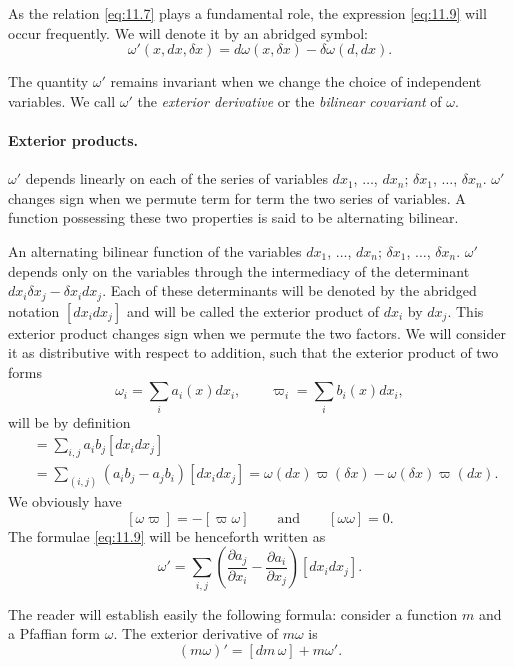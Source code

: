 \documentclass[leqno,11pt]{book}
\numberwithin{equation}{chapter}
\newcommand{\pd}{\partial}
\theoremstyle{shape1}
\theoremstyle{shapesmall}
\newcommand{\vp}{\varpi}
\begin{document}
As the relation \eqref{eq:11.7} plays a fundamental role, the expression \eqref{eq:11.9} will occur frequently. We will denote it by an abridged symbol:
\begin{equation}
  \label{eq:11.10}
  \omega'(x,dx,\delta x)=d\omega(x,\delta x)-\delta\omega(d,dx).
\end{equation}

The quantity $\omega'$ remains invariant when we change the choice of independent variables. We call $\omega'$ the \emph{exterior derivative} or the \emph{bilinear covariant} of $\omega$.

\paragraph{Exterior products.}
\label{sec:156}
$\omega'$ depends linearly on each of the series of variables $dx_{1}$, $\dots$, $dx_{n}$; $\delta x_{1}$, $\dots$, $\delta x_{n}$. $\omega'$ changes sign when we permute term for term the two series of variables. A function possessing these two properties is said to be alternating bilinear.

An alternating bilinear function of the variables $dx_{1}$, $\dots$, $dx_{n}$; $\delta x_{1}$, $\dots$, $\delta x_{n}$. $\omega'$ depends only on the variables through the intermediacy of the determinant $dx_{i}\delta x_{j}-\delta x_{i}dx_{j}$. Each of these determinants will be denoted by the abridged notation $[dx_{i}dx_{j}]$ and will be called the exterior product of $dx_{i}$ by $dx_{j}$. This exterior product changes sign when we permute the two factors. We will consider it as distributive with respect to addition, such that the exterior product of two forms
\[
\omega_{i}=\sum_{i}a_{i}(x)dx_{i},\qquad\vp_{i}=\sum_{i}b_{i}(x)dx_{i},
\]
will be by definition
\begin{align*}
  [\omega\vp]&=\sum_{i,j}a_{i}b_{j}[dx_{i}dx_{j}]\\
  &=\sum_{(i,j)}(a_{i}b_{j}-a_{j}b_{i})[dx_{i}dx_{j}]=\omega(dx)\vp(\delta x)-\omega(\delta x)\vp(dx).
\end{align*}
We obviously have
\[
[\omega\vp]=-[\vp\omega]\qquad\text{and}\qquad[\omega\omega]=0.
\]
The formulae \eqref{eq:11.9} will be henceforth written as
\[
\omega'=\sum_{i,j}\left(\frac{\pd a_{j}}{\pd x_{i}}-\frac{\pd a_{i}}{\pd x_{j}}\right)[dx_{i}dx_{j}].
\]

The reader will establish easily the following formula: consider a function $m$ and a Pfaffian form $\omega$. The exterior derivative of $m\omega$ is
\begin{equation}
  \label{eq:11.11}
  (m\omega)'=[dm\,\omega]+m\omega'.
\end{equation}
\end{document}
